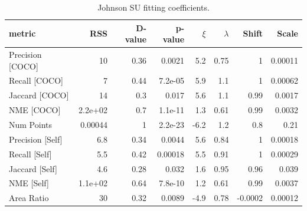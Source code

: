 \documentclass[12pt]{article}
\begin{document}
\begin{appendices}
\begin{table}[ht]
\centering
\begin{tabular}{lrrrrrrr}
\hline
 metric           &      RSS &   D-value &   p-value &   $\xi$ &   $\lambda$ &   Shift &   Scale \\
\hline
 Precision [COCO] & 10       &      0.36 &   0.0021  &  5.2 &     0.75 &  1      & 0.00011 \\
 Recall [COCO]    &  7       &      0.44 &   7.2e-05 &  5.9 &     1.1  &  1      & 0.00062 \\
 Jaccard [COCO]   & 14       &      0.3  &   0.017   &  5.6 &     1.1  &  0.99   & 0.0017  \\
 NME [COCO]       &  2.2e+02 &      0.7  &   1.1e-11 &  1.3 &     0.61 &  0.99   & 0.0032  \\
 Num Points       &  0.00044 &      1    &   2.2e-23 & -6.2 &     1.2  &  0.8    & 0.21    \\
 Precision [Self] &  6.8     &      0.34 &   0.0044  &  5.6 &     0.84 &  1      & 0.00018 \\
 Recall [Self]    &  5.5     &      0.42 &   0.00018 &  5.5 &     0.91 &  1      & 0.00029 \\
 Jaccard [Self]   &  4.6     &      0.28 &   0.032   &  1.6 &     0.95 &  0.96   & 0.039   \\
 NME [Self]       &  1.1e+02 &      0.64 &   7.8e-10 &  1.2 &     0.61 &  0.99   & 0.0037  \\
 Area Ratio       & 30       &      0.32 &   0.0089  & -4.9 &     0.78 & -0.0002 & 0.00012 \\
\hline
\end{tabular}
\caption{Johnson SU fitting coefficients.}
\label{jsu_tbl}
\end{table}


\end{appendices}
\end{document}
